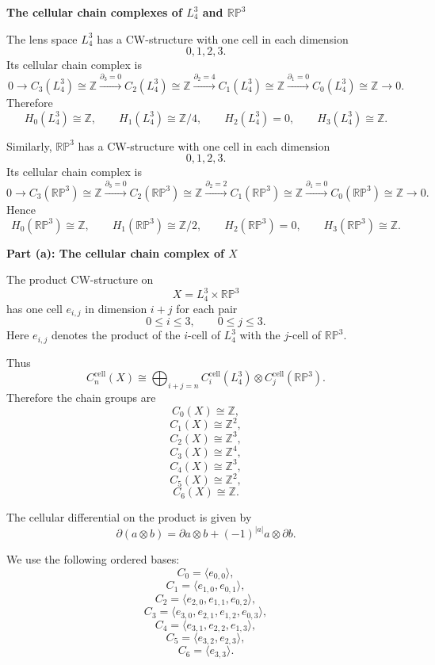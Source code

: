 \begin{solution}

\medskip
\noindent\textbf{The cellular chain complexes of \(L_4^3\) and \(\mathbb{RP}^3\)}\par
\smallskip


The lens space \(L_4^3\) has a CW-structure with one cell in each dimension
\[
0,1,2,3.
\]
Its cellular chain complex is
\[
0
\longrightarrow C_3(L_4^3)\cong \mathbb Z
\xrightarrow{\partial_3=0}
C_2(L_4^3)\cong \mathbb Z
\xrightarrow{\partial_2=4}
C_1(L_4^3)\cong \mathbb Z
\xrightarrow{\partial_1=0}
C_0(L_4^3)\cong \mathbb Z
\longrightarrow 0.
\]
Therefore
\[
H_0(L_4^3)\cong \mathbb Z,
\qquad
H_1(L_4^3)\cong \mathbb Z/4,
\qquad
H_2(L_4^3)=0,
\qquad
H_3(L_4^3)\cong \mathbb Z.
\]

Similarly, \(\mathbb{RP}^3\) has a CW-structure with one cell in each dimension
\[
0,1,2,3.
\]
Its cellular chain complex is
\[
0
\longrightarrow C_3(\mathbb{RP}^3)\cong \mathbb Z
\xrightarrow{\partial_3=0}
C_2(\mathbb{RP}^3)\cong \mathbb Z
\xrightarrow{\partial_2=2}
C_1(\mathbb{RP}^3)\cong \mathbb Z
\xrightarrow{\partial_1=0}
C_0(\mathbb{RP}^3)\cong \mathbb Z
\longrightarrow 0.
\]
Hence
\[
H_0(\mathbb{RP}^3)\cong \mathbb Z,
\qquad
H_1(\mathbb{RP}^3)\cong \mathbb Z/2,
\qquad
H_2(\mathbb{RP}^3)=0,
\qquad
H_3(\mathbb{RP}^3)\cong \mathbb Z.
\]


\medskip
\noindent\textbf{Part (a): The cellular chain complex of \(X\)}\par
\smallskip


The product CW-structure on
\[
X=L_4^3\times \mathbb{RP}^3
\]
has one cell \(e_{i,j}\) in dimension \(i+j\) for each pair
\[
0\leq i\leq 3,
\qquad
0\leq j\leq 3.
\]
Here \(e_{i,j}\) denotes the product of the \(i\)-cell of \(L_4^3\) with the \(j\)-cell of \(\mathbb{RP}^3\).

Thus
\[
C_n^{\mathrm{cell}}(X)
\cong
\bigoplus_{i+j=n}
C_i^{\mathrm{cell}}(L_4^3)\otimes C_j^{\mathrm{cell}}(\mathbb{RP}^3).
\]
Therefore the chain groups are
\[
C_0(X)\cong \mathbb Z,
\]
\[
C_1(X)\cong \mathbb Z^2,
\]
\[
C_2(X)\cong \mathbb Z^3,
\]
\[
C_3(X)\cong \mathbb Z^4,
\]
\[
C_4(X)\cong \mathbb Z^3,
\]
\[
C_5(X)\cong \mathbb Z^2,
\]
\[
C_6(X)\cong \mathbb Z.
\]

The cellular differential on the product is given by
\[
\partial(a\otimes b)
=
\partial a\otimes b
+
(-1)^{|a|}a\otimes \partial b.
\]

We use the following ordered bases:
\[
C_0=\langle e_{0,0}\rangle,
\]
\[
C_1=\langle e_{1,0},e_{0,1}\rangle,
\]
\[
C_2=\langle e_{2,0},e_{1,1},e_{0,2}\rangle,
\]
\[
C_3=\langle e_{3,0},e_{2,1},e_{1,2},e_{0,3}\rangle,
\]
\[
C_4=\langle e_{3,1},e_{2,2},e_{1,3}\rangle,
\]
\[
C_5=\langle e_{3,2},e_{2,3}\rangle,
\]
\[
C_6=\langle e_{3,3}\rangle.
\]


\end{solution}
